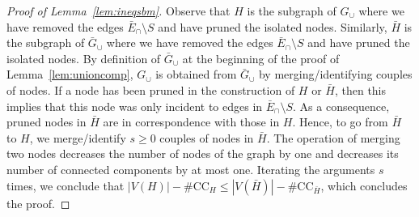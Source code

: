 \documentclass[final]{colt2026}
\newcommand{\1}{\mathbf{1}}
\begin{document}
\begin{proof}[Proof of Lemma~\ref{lem:ineqsbm}]
Observe that $H$ is the subgraph of $G_\cup$ where we have removed the edges $\bar E_\cap \setminus S$ and have pruned the isolated nodes. Similarly, $\bar{H}$ is the subgraph of $\bar G_{\cup}$ where we have  removed the edges $\bar E_\cap \setminus S$ and have pruned the isolated nodes. By definition of $\bar G_{\cup}$ at the beginning of the proof of Lemma~\ref{lem:unioncomp}, $G_{\cup}$ is obtained from $\bar G_{\cup}$ by merging/identifying couples of nodes. If a node has been pruned in the construction of $H$ or $\bar{H}$, then this implies that this node was only incident to edges in $\bar E_\cap \setminus S$. As a consequence, pruned nodes in $\bar{H}$ are in correspondence with those in $H$. Hence, to go from $\bar{H}$ to $H$, we merge/identify $s\geq 0$ couples of nodes in $\bar H$. The operation of merging two nodes decreases the number of nodes of the graph by one and decreases its number of connected components by at most one. Iterating the arguments $s$ times, we conclude that $  |V(H)|- \#\mathrm{CC}_H\leq |V(\bar H)|- \#\mathrm{CC}_{\bar H}$, which concludes the proof. 

\end{proof}
\end{document}
